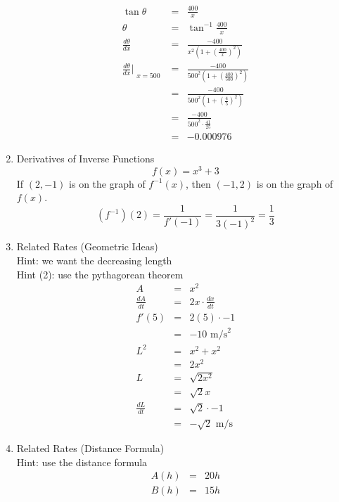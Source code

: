 \documentclass{article}
\begin{document}
\begin{enumerate}
\begin{eqnarray}
        \tan{\theta} &=& \frac{400}{x} \\
        \theta &=& \tan^{-1}{\frac{400}{x}} \\
        \frac{d\theta}{dx} &=& \frac{-400}{x^2\left(1 + \left(\frac{400}{x}\right)^2\right)} \\
        \frac{d\theta}{dx}\Bigr|_{\substack{x = 500}} &=& \frac{-400}{500^2\left(1 + \left(\frac{400}{500}\right)^2\right)} \\
                                                      &=& \frac{-400}{500^2\left(1 + \left(\frac{4}{5}\right)^2\right)} \\
                                                      &=& \frac{-400}{500^2 \cdot \frac{41}{25}} \\
                                                      &=& -0.000976
    \end{eqnarray}
    \item Derivatives of Inverse Functions
        $$f(x) = x^3 + 3$$
        If $(2, -1)$ is on the graph of $f^{-1}(x)$, then $(-1, 2)$ is on the graph of $f(x)$.
        $$\left(f^{-1}\right)\left(2\right) = \frac{1}{f'\left(-1\right)} = \frac{1}{3\left(-1\right)^2} = \frac{1}{3}$$
    \item Related Rates (Geometric Ideas)
    \\ Hint: we want the decreasing length
    \\ Hint (2): use the pythagorean theorem
    \begin{eqnarray}
        A &=& x^2 \\
        \frac{dA}{dt} &=& 2x \cdot \frac{dx}{dt} \\
        f'(5) &=& 2(5) \cdot -1 \\
              &=& -10 \text{ m/s}^2 \\
        L^2 &=& x^2 + x^2 \\
            &=& 2x^2 \\
        L &=& \sqrt{2x^2} \\
          &=& \sqrt{2}x \\
        \frac{dL}{dt} &=& \sqrt{2} \cdot -1 \\
                      &=& -\sqrt{2} \text{ m/s}
    \end{eqnarray}
    \item Related Rates (Distance Formula)
    \\ Hint: use the distance formula
    \begin{eqnarray}
        A(h) &=& 20h \\
        B(h) &=& 15h \\

\end{eqnarray}
\end{enumerate}
\end{document}
